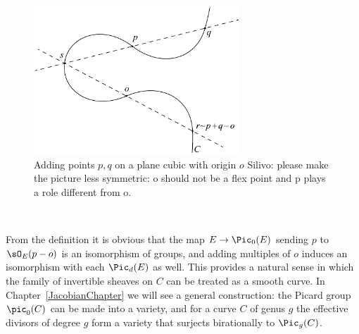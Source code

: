 \begin{figure}\label{group law on cubic}
\centerline {\includegraphics[height=2.2in]{"main/Fig03-2"}}
 \caption{Adding points $p, q$ on a plane cubic with origin $o$
 {Silivo: please make the picture less symmetric: o should not be a flex point and p plays a role different from o.}}
\end{figure}

\
\begin{remark}
From the definition it is obvious that 
the map
$E \to \Pic_0(E)$ sending $p$ to $\sO_E(p-o)$ is an isomorphism of groups, and adding multiples of $o$
induces an isomorphism with each $\Pic_d(E)$ as well. This provides a natural sense
in which the family of invertible sheaves on $C$ can be treated as a smooth curve.
 In Chapter~\ref{JacobianChapter} we will see a general construction: the Picard group $\pic_0(C)$ can be made into
a variety, and for a curve $C$ of genus $g$ the effective divisors
of degree $g$ form a variety that surjects birationally to $\Pic_g(C)$. 
\end{remark}
 
%

